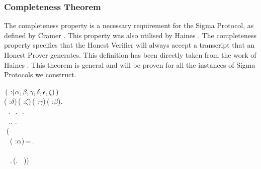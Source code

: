 \subsubsection{Completeness Theorem}
The completeness property is a necessary requirement for the Sigma Protocol, as defined by Cramer \cite{Cramer1997ModularDO}. 
This property was also utilised by Haines \cite{Haines2019VerifiedVF}. The completeness property specifies that the Honest Verifier will always accept a transcript that an Honest Prover generates. This definition has been directly taken from the work of Haines \cite{Haines2019VerifiedVF}.
This theorem is general and will be proven for all the instances of Sigma Protocols we construct.
\begin{holmath}
    \,( :(\ensuremath{\alpha},\,\ensuremath{\beta},\,\ensuremath{\gamma},\,\ensuremath{\delta},\,\ensuremath{\epsilon},\,\ensuremath{\zeta})\,)\,\HOLSymConst{\HOLTokenEquiv{}}\\
\HOLSymConst{\HOLTokenForall{}}( :\ensuremath{\delta})\,( :\ensuremath{\zeta})\,( :\ensuremath{\gamma})\,( :\ensuremath{\beta}).\\
\,\,\,\HOLSymConst{\HOLTokenIn{}}\,.\,\HOLSymConst{\HOLTokenConj{}}\,\,\HOLSymConst{\HOLTokenIn{}}\,.\,\HOLSymConst{\HOLTokenConj{}}\,\,\HOLSymConst{\HOLTokenIn{}}\,.\,\HOLSymConst{\HOLTokenConj{}}\\
\,\,\,\HOLSymConst{\HOLTokenIn{}}\,..\,\HOLSymConst{\HOLTokenConj{}}\,.\,\,\,\HOLSymConst{\HOLTokenImp{}}\\
\,\,(\\
\,\,\,\,\,( :\ensuremath{\alpha})\,=\,.\,\,\,\\
\,\,\,\\
\,\,\,\,\,.\,(\HOLSymConst{,}\HOLSymConst{,}\HOLSymConst{,}.\,\,\,\,\,))
\end{holmath} 

